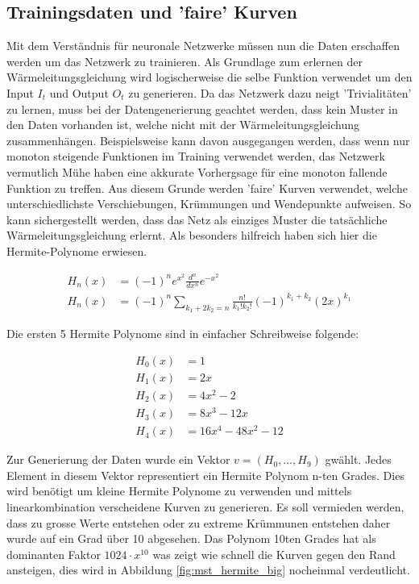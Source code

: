 \subsection{Trainingsdaten und 'faire' Kurven}
Mit dem Verständnis für neuronale Netzwerke müssen nun die Daten erschaffen werden um das Netzwerk zu trainieren. Als Grundlage zum erlernen der Wärmeleitungsgleichung wird logischerweise die selbe Funktion verwendet um den Input $I_{t}$ und Output $O_{t}$ zu generieren. Da das Netzwerk dazu neigt 'Trivialitäten' zu lernen, muss bei der Datengenerierung geachtet werden, dass kein Muster in den Daten vorhanden ist, welche nicht mit der Wärmeleitungsgleichung zusammenhängen. Beispielsweise kann davon ausgegangen werden, dass wenn nur monoton steigende Funktionen im Training verwendet werden, das Netzwerk vermutlich Mühe haben eine akkurate Vorhergsage für eine monoton fallende Funktion zu treffen. Aus diesem Grunde werden 'faire' Kurven verwendet, welche unterschiedlichste Verschiebungen, Krümmungen und Wendepunkte aufweisen. So kann sichergestellt werden, dass das Netz als einziges Muster die tatsächliche Wärmeleitungsgleichung erlernt. Als besonders hilfreich haben sich hier die Hermite-Polynome erwiesen.

\begin{align}
H_{n}(x) &=(-1)^{n}e^{x^{2}}{\frac {d^{n}}{d x^{n}}}e^{-x^{2}} \\
H_{n}(x) &=(-1)^{n}\sum _{k_{1}+2k_{2}=n}{\frac {n!}{k_{1}!k_{2}!}}(-1)^{k_{1}+k_{2}}(2x)^{k_{1}}
\end{align}

Die ersten 5 Hermite Polynome sind in einfacher Schreibweise folgende:

\begin{align}
H_{0}(x) &= 1\\
H_{1}(x) &= 2x\\
H_{2}(x) &= 4x^{2}-2\\
H_{3}(x) &= 8x^{3}-12x\\
H_{4}(x) &= 16x^{4}-48x^{2}-12
\end{align}

Zur Generierung der Daten wurde ein Vektor $v=(H_0, \dots ,H_9)$ gwählt. Jedes Element in diesem Vektor representiert ein Hermite Polynom n-ten Grades. Dies wird benötigt um kleine Hermite Polynome zu verwenden und mittels linearkombination verscheidene Kurven zu generieren. Es soll vermieden werden, dass zu grosse Werte entstehen oder zu extreme Krümmunen entstehen daher wurde auf ein Grad über 10 abgesehen. Das Polynom 10ten Grades hat als dominanten Faktor $1024 \cdot x^{10}$ was zeigt wie schnell die Kurven gegen den Rand ansteigen, dies wird in Abbildung \ref{fig:mst_hermite_big} nocheinmal verdeutlicht.

